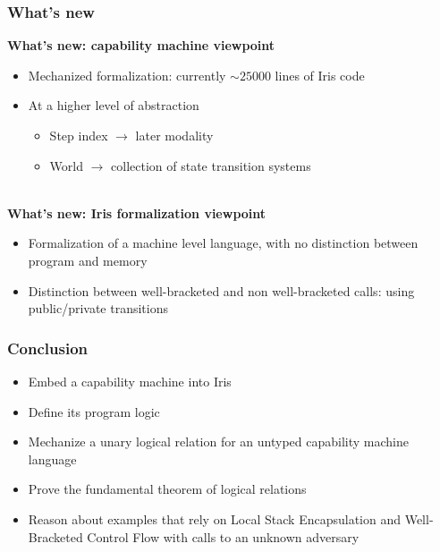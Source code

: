 \documentclass{beamer}
\begin{document}
\begin{frame}
\frametitle{What's new}

\textbf{What's new: capability machine viewpoint}

\begin{itemize}
	\item Mechanized formalization: currently $\sim 25 000$ lines of Iris code
	\item At a higher level of abstraction
	\begin{itemize}
		\item<2-> Step index $\rightarrow$ later modality
		\item<3-> World $\rightarrow$ collection of state transition systems
	\end{itemize}
\end{itemize}

~\\[0.5em]
\textbf{What's new: Iris formalization viewpoint}
\begin{itemize}
	\item Formalization of a machine level language, with no distinction between program and memory
	\item Distinction between  well-bracketed and non well-bracketed calls: using public/private transitions
\end{itemize}

\end{frame}


\begin{frame}
\frametitle{Conclusion}

\begin{itemize}
	\item Embed a capability machine into Iris
	\item Define its program logic 
	\item Mechanize a unary logical relation for an untyped capability machine language
	\item Prove the fundamental theorem of logical relations
	\item Reason about examples that rely on Local Stack Encapsulation and Well-Bracketed Control Flow with calls to an unknown adversary
\end{itemize}

\end{frame}
\end{document}
